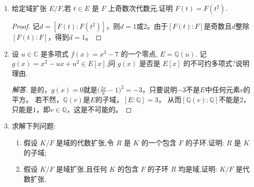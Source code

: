 \begin{enumerate}
\begin{proof}[解答]
        下面举个这样的$f(x)$的具体例子。简写$\zeta=e^{\frac{2\pi{\rm i}}{7}}$，
        则$\zeta,\zeta^2,\zeta^3$都是不可约多项式
        \[\frac{y^7-1}{y-1}=y^6+y^5+y^4+y^3+y^2+y+1\]
        的根，即\[(y^3+y^{-3})+(y^2+y^{-2})+(y+y^{-1})+1=0.\]
        令$x=y+y^{-1}$，代入得到
        \[(x^3-3x)+(x^2-2)+x+1=0,\]
        也就是说
        \[\zeta+\zeta^{-1}=2\cos\Big(\frac{2\pi}{7}\Big),\quad
        \zeta^2+\zeta^{-2}=2\cos\Big(\frac{4\pi}{7}\Big),\quad
        \zeta^3+\zeta^{-3}=2\cos\Big(\frac{6\pi}{7}\Big)\]
        皆是$f(x)=x^3+x^2-2x-1$的根。
    \end{proof}

    \item 给定域扩张 $E/F$,若 $t \in E$ 是 $F$ 上奇数次代数元,证明 $F(t) = F(t^2)$.
    \begin{proof}
        记$d=[F(t):F(t^2)]$，则$d=1$或$2$。由于$[F(t):F]$是奇数且$d$整除$[F(t):F]$，得到$d=1$。
    \end{proof}

    \item 设 $u \in \mathbb{C}$ 是多项式 $f(x) = x^3 - 7$ 的一个零点, $E = \mathbb{Q}(u)$.
    记 $g(x) = x^2 - ux + u^2 \in E[x]$,问 $g(x)$ 是否是 $E[x]$ 的不可约多项式?说明理由.
    \begin{proof}[解答]
        是的，$g(x)=0$就是$\big(\frac{2x}{u}-1\big)^2=-3$，只要说明$-3$不是$E$中任何元素$v$的平方。
        若不然，$\mathbb{Q}(v)$是$E$的子域，$[E:\mathbb{Q}]=3$，
        从而$[\mathbb{Q}(v):\mathbb{Q}]$不能是$2$，只能是$1$，即$v\in\mathbb{Q}$，这是不可能的。
    \end{proof}

    \item 求解下列问题:
    \begin{enumerate}[label=(\arabic*)]
        \item 假设 $K/F$ 是域的代数扩张,令 $R$ 是 $K$ 的一个包含 $F$ 的子环.证明: $R$ 是 $K$ 的子域;
        \item 假设 $K/F$ 是域扩张,且任何 $K$ 的包含 $F$ 的子环 $R$ 均是域,证明: $K/F$ 是代数扩张.
    \end{enumerate}


\end{enumerate}
